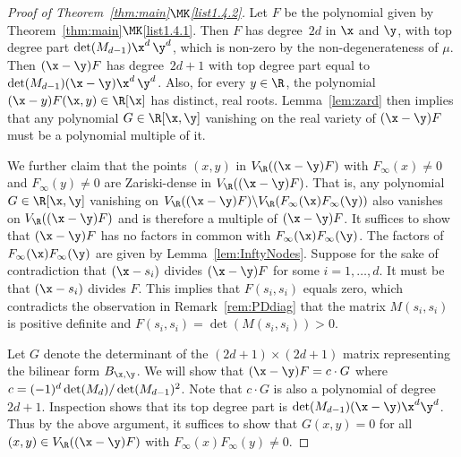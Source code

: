 \begin{proof}[Proof of Theorem~\ref{thm:main}$\MK$\eqref{list1.4.2}]
Let $F$ be the polynomial given by Theorem~\ref{thm:main}$\MK$\eqref{list1.4.1}. Then $F$ has degree~$2d$ in $\x$ and $\y$, with top degree part $\det(M_{d-1})\x^d\,\y^d$, which is non-zero by the non-degenerateness of $\mu$. Then $(\x-\y)F$ has degree~$2d+1$ with top degree part equal to $\det(M_{d-1})(\x-\y)\x^d\,\y^d$. Also, for every $y\in \R$, the polynomial $(\x-y)F(\x,y)\in \R[\x]$ has distinct, real roots. Lemma~\ref{lem:zard} then implies that any polynomial $G\in \R[\x,\y]$ vanishing on the real variety of $(\x-\y)F$ must be a polynomial multiple of it.

We further claim that the points $(x,y)$ in $V_\R((\x-\y)F)$ with $F_{\infty}(x)\neq0$ and $F_{\infty}(y)\neq0$ are Zariski-dense in $V_\R((\x-\y)F)$. That is, any polynomial $G\in \R[\x,\y]$ vanishing on $V_\R((\x-\y)F)\backslash V_\R(F_{\infty}(\x)F_{\infty}(\y))$ also vanishes on $V_\R((\x-\y)F)$ and is therefore a multiple of $(\x-\y)F$. It suffices to show that $(\x-\y)F$ has no factors in common with $F_{\infty}(\x)F_{\infty}(\y)$. The factors of $F_{\infty}(\x)F_{\infty}(\y)$ are given by Lemma~\ref{lem:InftyNodes}. Suppose for the sake of contradiction that $(\x-s_i)$ divides $(\x-\y)F$ for some $i=1,\hdots, d$. It must be that $(\x-s_i)$ divides $F$. This implies that $F(s_i, s_i)$ equals zero, which contradicts the observation in Remark~\ref{rem:PDdiag} that the matrix $M(s_i,s_i)$ is positive definite and $F(s_i,s_i)= \det(M(s_i,s_i))>0$.


Let $G$ denote the determinant of the $(2d+1)\times (2d+1)$ matrix representing the bilinear form $B_{\x,\y}$. We will show that $(\x-\y)F = c\cdot G$ where $c = (-1)^d \det(M_d)/\linebreak\det(M_{d-1})^2$. Note that $c \cdot G$ is also a polynomial of degree~$2d+1$. Inspection shows that its top degree part is $\det(M_{d-1})(\x-\y)\x^d\y^d$. Thus by the above argument, it suffices to show that $G(x,y)=0$ for all $(x,y)\in V_\R((\x-\y)F)$ with $F_{\infty}(x)F_{\infty}(y)\neq 0$.


\end{proof}
